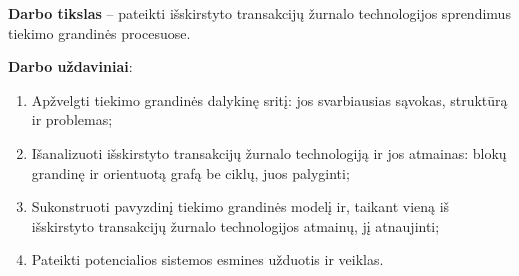 \textbf{Darbo tikslas} – pateikti išskirstyto transakcijų žurnalo technologijos sprendimus tiekimo grandinės procesuose. 

\textbf{Darbo uždaviniai}:
\begin{enumerate}
    \item Apžvelgti tiekimo grandinės dalykinę sritį: jos svarbiausias sąvokas, struktūrą ir problemas;
    \item Išanalizuoti išskirstyto transakcijų žurnalo technologiją ir jos atmainas: blokų grandinę ir orientuotą grafą be ciklų, juos palyginti;
    \item Sukonstruoti pavyzdinį tiekimo grandinės modelį ir, taikant vieną iš išskirstyto transakcijų žurnalo technologijos atmainų, jį atnaujinti;
    \item Pateikti potencialios sistemos esmines užduotis ir veiklas.
\end{enumerate}